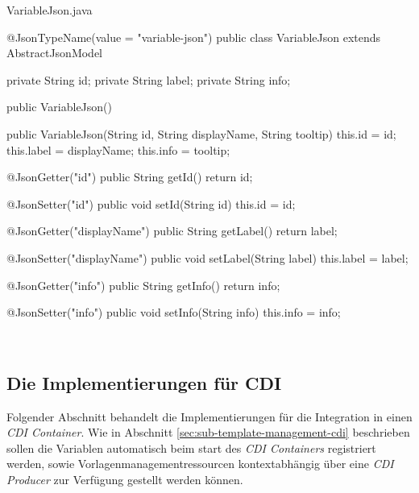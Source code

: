 \begin{program}
\caption{VariableJson.java}
\label{prog:variableJson}
\begin{JsCode}
@JsonTypeName(value = "variable-json")
public class VariableJson extends AbstractJsonModel {

    private String id;
    private String label;
    private String info;

    public VariableJson() {
    }

    public VariableJson(String id,
                        String displayName,
                        String tooltip) {
        this.id = id;
        this.label = displayName;
        this.info = tooltip;
    }

    @JsonGetter("id")
    public String getId() {
        return id;
    }

    @JsonSetter("id")
    public void setId(String id) {
        this.id = id;
    }

    @JsonGetter("displayName")
    public String getLabel() {
        return label;
    }

    @JsonSetter("displayName")
    public void setLabel(String label) {
        this.label = label;
    }

    @JsonGetter("info")
    public String getInfo() {
        return info;
    }

    @JsonSetter("info")
    public void setInfo(String info) {
        this.info = info;
    }
    
}
\end{JsCode}
\end{program}
\ \newpage


\subsection{Die Implementierungen für CDI}
Folgender Abschnitt behandelt die Implementierungen für die Integration in einen \emph{CDI Container}. Wie in Abschnitt \ref{sec:sub-template-management-cdi} beschrieben sollen die Variablen automatisch beim start des \emph{CDI Containers} registriert werden, sowie Vorlagenmanagementressourcen kontextabhängig über eine \emph{CDI Producer} zur Verfügung gestellt werden können. 

